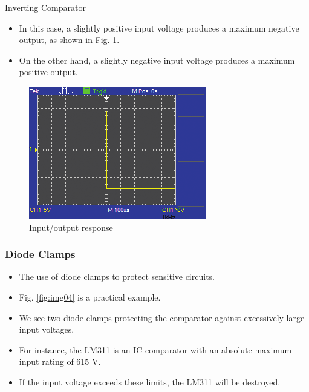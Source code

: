\documentclass[pdflatex,compress]{beamer}
\begin{document}
\begin{frame}{Inverting Comparator}
	\begin{multicols}{2}
		\begin{itemize}
			\item In this case, a slightly positive input voltage produces a maximum negative output, as shown in Fig. \ref{fig:img05}.
			\item On the other hand, a slightly negative input voltage produces a maximum positive output.
		\end{itemize}
		\begin{figure}
			\centering
			\includegraphics[width=\linewidth]{img/img05}
			\caption{Input/output response}
			\label{fig:img05}
		\end{figure}
	\end{multicols}
\end{frame}

\begin{frame}
	\frametitle{Diode Clamps}
	\begin{itemize}
		\item The use of diode clamps to protect sensitive circuits.
		\item Fig. \ref{fig:img04} is a practical example.
		\item We see two diode clamps protecting the comparator against excessively large input voltages.
		\item For instance, the LM311 is an IC comparator with an absolute maximum input rating of 615 V.
		\item If the input voltage exceeds these limits, the LM311 will be destroyed.
	\end{itemize}
\end{frame}
\end{document}
